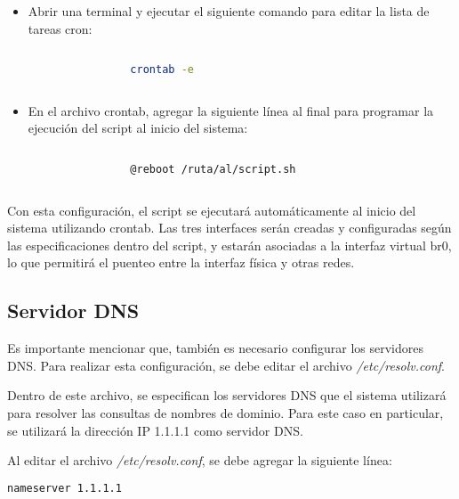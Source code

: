 		\begin{itemize}
		
			\item Abrir una terminal y ejecutar el siguiente comando para editar la lista de tareas cron:
	
			\begin{lstlisting}[language=Bash, caption=crontab]
	
				crontab -e
	
			\end{lstlisting}
	
			\item En el archivo crontab, agregar la siguiente línea al final para programar la ejecución del script al inicio del sistema:
	
			\begin{lstlisting}[language=Bash, caption=ruta del archivo]
	
				@reboot /ruta/al/script.sh
		
			\end{lstlisting}
	
		\end{itemize}
	
		Con esta configuración, el script se ejecutará automáticamente al inicio del sistema utilizando crontab. Las tres interfaces serán creadas y configuradas según las especificaciones dentro del script, y estarán asociadas a la interfaz virtual br0, lo que permitirá el puenteo entre la interfaz física y otras redes.
					
		\subsection{Servidor DNS}
		
		
			Es importante mencionar que, también es necesario configurar los servidores DNS. Para realizar esta configuración, se debe editar el archivo \textit{/etc/resolv.conf}.\par

			Dentro de este archivo, se especifican los servidores DNS que el sistema utilizará para resolver las consultas de nombres de dominio. Para este caso en particular, se utilizará la dirección IP 1.1.1.1 como servidor DNS.

			Al editar el archivo \textit{/etc/resolv.conf}, se debe agregar la siguiente línea:
		
		
			\begin{lstlisting}[language=Bash, caption=resolv]		
				nameserver 1.1.1.1
			\end{lstlisting}
		

